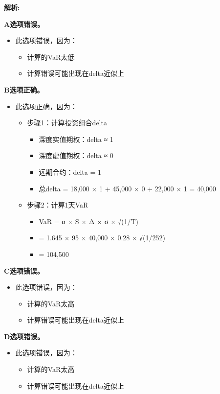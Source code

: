 \documentclass{article}
\newenvironment{explanation}
{\textbf{解析:}\par}
{\par}
\begin{document}
\begin{explanation}
    \textbf{A选项错误。}
    \begin{itemize}
        \item 此选项错误，因为：
        \begin{itemize}
            \item 计算的VaR太低
            \item 计算错误可能出现在delta近似上
        \end{itemize}
    \end{itemize}
    \textbf{B选项正确。}
    \begin{itemize}
        \item 此选项正确，因为：
        \begin{itemize}
            \item 步骤1：计算投资组合delta
            \begin{itemize}
                \item 深度实值期权：delta ≈ 1
                \item 深度虚值期权：delta ≈ 0
                \item 远期合约：delta = 1
                \item 总delta = 18,000 × 1 + 45,000 × 0 + 22,000 × 1 = 40,000
            \end{itemize}
            \item 步骤2：计算1天VaR
            \begin{itemize}
                \item VaR = α × S × Δ × σ × √(1/T)
                \item = 1.645 × 95 × 40,000 × 0.28 × √(1/252)
                \item = 104,500
            \end{itemize}
        \end{itemize}
    \end{itemize}
    \textbf{C选项错误。}
    \begin{itemize}
        \item 此选项错误，因为：
        \begin{itemize}
            \item 计算的VaR太高
            \item 计算错误可能出现在delta近似上
        \end{itemize}
    \end{itemize}
    \textbf{D选项错误。}
    \begin{itemize}
        \item 此选项错误，因为：
        \begin{itemize}
            \item 计算的VaR太高
            \item 计算错误可能出现在delta近似上
        \end{itemize}
    \end{itemize}
\end{explanation}
\end{document}
